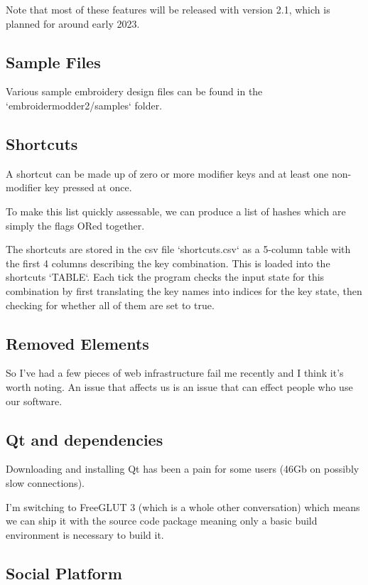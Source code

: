 Note that most of these features will be released with version 2.1, which is planned for around
early 2023.

\subsection{Sample Files}

Various sample embroidery design files can be found in the `embroidermodder2/samples` folder.

\subsection{Shortcuts}

A shortcut can be made up of zero or more modifier keys and at least one non-modifier key
pressed at once.

To make this list quickly assessable, we can produce a list of hashes which are simply the
flags ORed together.

The shortcuts are stored in the csv file `shortcuts.csv` as a 5-column table
with the first 4 columns describing the key combination. This is loaded into
the shortcuts `TABLE`. Each tick the program checks the input state for this
combination by first translating the key names into indices for the key state,
then checking for whether all of them are set to true.

\subsection{Removed Elements}

So I've had a few pieces of web infrastructure fail me recently and I think
it's worth noting. An issue that affects us is an issue that can effect people
who use our software.

\subsection{Qt and dependencies}

Downloading and installing Qt has been a pain for some users (46Gb on possibly
slow connections).

I'm switching to FreeGLUT 3 (which is a whole other conversation) which means
we can ship it with the source code package meaning only a basic build
environment is necessary to build it.

\subsection{Social Platform}

